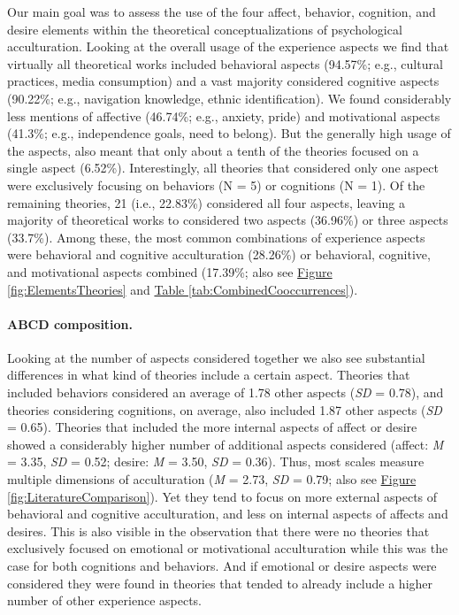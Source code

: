 \documentclass[man, 12pt, a4paper, mask]{apa7}
\newcommand{\fgrref}[2][]{\hyperref[#2]{Figure \ref*{#2}#1}}
\newcommand{\tblref}[2][]{\hyperref[#2]{Table \ref*{#2}#1}}
\begin{document}
Our main goal was to assess the use of the four affect, behavior,
cognition, and desire elements within the theoretical conceptualizations
of psychological acculturation. Looking at the overall usage of the
experience aspects we find that virtually all theoretical works included
behavioral aspects (94.57\%; e.g., cultural practices, media
consumption) and a vast majority considered cognitive aspects (90.22\%;
e.g., navigation knowledge, ethnic identification). We found
considerably less mentions of affective (46.74\%; e.g., anxiety, pride)
and motivational aspects (41.3\%; e.g., independence goals, need to
belong). But the generally high usage of the aspects, also meant that
only about a tenth of the theories focused on a single aspect (6.52\%).
Interestingly, all theories that considered only one aspect were
exclusively focusing on behaviors (N = 5) or cognitions (N = 1). Of the
remaining theories, 21 (i.e., 22.83\%) considered all four aspects,
leaving a majority of theoretical works to considered two aspects
(36.96\%) or three aspects (33.7\%). Among these, the most common
combinations of experience aspects were behavioral and cognitive
acculturation (28.26\%) or behavioral, cognitive, and motivational
aspects combined (17.39\%; also see \fgrref{fig:ElementsTheories} and
\tblref{tab:CombinedCooccurrences}).

\paragraph{ABCD composition.}

Looking at the number of aspects considered together we also see
substantial differences in what kind of theories include a certain
aspect. Theories that included behaviors considered an average of 1.78
other aspects (\textit{SD} = 0.78), and theories considering cognitions,
on average, also included 1.87 other aspects (\textit{SD} = 0.65).
Theories that included the more internal aspects of affect or desire
showed a considerably higher number of additional aspects considered
(affect: \textit{M} = 3.35, \textit{SD} = 0.52; desire: \textit{M} =
3.50, \textit{SD} = 0.36). Thus, most scales measure multiple dimensions
of acculturation (\textit{M} = 2.73, \textit{SD} = 0.79; also see
\fgrref{fig:LiteratureComparison}). Yet they tend to focus on more
external aspects of behavioral and cognitive acculturation, and less on
internal aspects of affects and desires. This is also visible in the
observation that there were no theories that exclusively focused on
emotional or motivational acculturation while this was the case for both
cognitions and behaviors. And if emotional or desire aspects were
considered they were found in theories that tended to already include a
higher number of other experience aspects.
\end{document}
